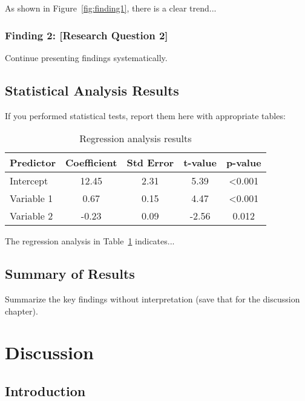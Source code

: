 \documentclass[12pt, a4paper]{report}
\begin{document}
	As shown in Figure~\ref{fig:finding1}, there is a clear trend...
	
	\subsection{Finding 2: [Research Question 2]}
	
	Continue presenting findings systematically.
	
	\section{Statistical Analysis Results}
	\label{sec:statistical}
	
	If you performed statistical tests, report them here with appropriate tables:
	
	\begin{table}[h]
		\centering
		\caption{Regression analysis results}
		\label{tab:regression}
		\begin{tabular}{lcccc}
			\toprule
			\textbf{Predictor} & \textbf{Coefficient} & \textbf{Std Error} & \textbf{t-value} & \textbf{p-value} \\
			\midrule
			Intercept & 12.45 & 2.31 & 5.39 & <0.001 \\
			Variable 1 & 0.67 & 0.15 & 4.47 & <0.001 \\
			Variable 2 & -0.23 & 0.09 & -2.56 & 0.012 \\
			\bottomrule
		\end{tabular}
	\end{table}
	
	The regression analysis in Table~\ref{tab:regression} indicates...
	
	\section{Summary of Results}
	
	Summarize the key findings without interpretation (save that for the discussion chapter).
	
	\chapter{Discussion}
	\label{chap:discussion}
	
	\section{Introduction}
	
\end{document}
